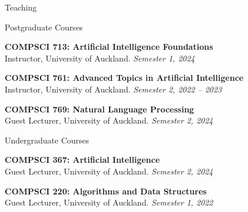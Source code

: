 \documentclass{resume} %
\begin{document}
\begin{rSection}{Teaching}
	\begin{rSubsection}{Postgraduate Courses}{}{}{}
	\item {\bf COMPSCI 713: Artificial Intelligence Foundations}\\ Instructor, University of Auckland. \hfill {\em Semester 1, 2024}
	\item {\bf COMPSCI 761: Advanced Topics in Artificial Intelligence}\\ Instructor, University of Auckland. \hfill {\em Semester 2, 2022 -- 2023}
	\item {\bf COMPSCI 769: Natural Language Processing}\\ Guest Lecturer, University of Auckland. \hfill {\em Semester 2, 2024} 
	\end{rSubsection}
	\begin{rSubsection}{Undergraduate Courses}{}{}{}
		\item {\bf COMPSCI 367: Artificial Intelligence}\\ Guest Lecturer, University of Auckland. \hfill {\em Semester 2, 2024}
		\item {\bf COMPSCI 220: Algorithms and Data Structures}\\ Guest Lecturer, University of Auckland. \hfill {\em Semester 1, 2022}
	\end{rSubsection}
\end{rSection}
\end{document}
